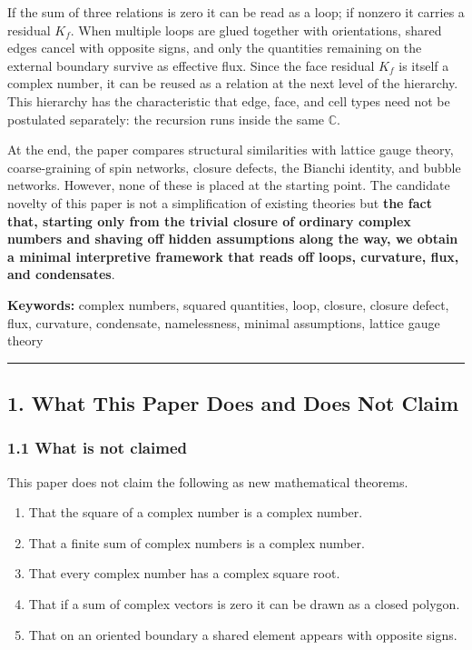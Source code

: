 \documentclass[
  a4paper,
]{article}
\newcounter{none} %
\providecommand{\tightlist}{%
  \setlength{\itemsep}{0pt}\setlength{\parskip}{0pt}}
\begin{document}
If the sum of three relations is zero it can be read as a loop; if
nonzero it carries a residual \(K_f\). When multiple loops are glued
together with orientations, shared edges cancel with opposite signs, and
only the quantities remaining on the external boundary survive as
effective flux. Since the face residual \(K_f\) is itself a complex
number, it can be reused as a relation at the next level of the
hierarchy. This hierarchy has the characteristic that edge, face, and
cell types need not be postulated separately: the recursion runs inside
the same \(\mathbb C\).

At the end, the paper compares structural similarities with lattice
gauge theory, coarse-graining of spin networks, closure defects, the
Bianchi identity, and bubble networks. However, none of these is placed
at the starting point. The candidate novelty of this paper is not a
simplification of existing theories but \textbf{the fact that, starting
only from the trivial closure of ordinary complex numbers and shaving
off hidden assumptions along the way, we obtain a minimal interpretive
framework that reads off loops, curvature, flux, and condensates}.

\textbf{Keywords:} complex numbers, squared quantities, loop, closure,
closure defect, flux, curvature, condensate, namelessness, minimal
assumptions, lattice gauge theory

\begin{center}\rule{0.5\linewidth}{0.5pt}\end{center}

\subsection{1. What This Paper Does and Does Not
Claim}\label{what-this-paper-does-and-does-not-claim}

\subsubsection{1.1 What is not claimed}\label{what-is-not-claimed}

This paper does not claim the following as new mathematical theorems.

\begin{enumerate}
\def\labelenumi{\arabic{enumi}.}
\tightlist
\item
  That the square of a complex number is a complex number.
\item
  That a finite sum of complex numbers is a complex number.
\item
  That every complex number has a complex square root.
\item
  That if a sum of complex vectors is zero it can be drawn as a closed
  polygon.
\item
  That on an oriented boundary a shared element appears with opposite
  signs.
\end{enumerate}
\end{document}
